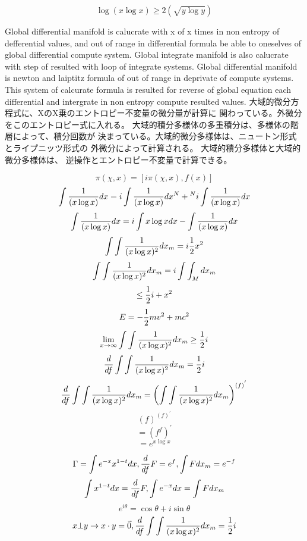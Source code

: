 \documentclass{jsarticle}
\begin{document}
  $$ \log (x \log x) \ge 2(\sqrt{y \log y}) $$

  Global differential manifold is calucrate with x of x times in non
  entropy of defferential values, and out of range in differential formula
  be able to oneselves of global differential compute system.
  Global integrate manifold is also calucrate with step of resulted with
  loop of integrate systems. Global differential manifold is newton and 
  laiptitz formula of out of range in deprivate of compute systems.
  This system of calcurate formula is resulted for reverse of global equation
  each differential and intergrate in non entropy compute resulted values.
  大域的微分方程式に、XのX乗のエントロピー不変量の微分量が計算に
  関わっている。外微分をこのエントロピー式に入れる。
  大域的積分多様体の多重積分は、多様体の階層によって、積分回数が
  決まっている。大域的微分多様体は、ニュートン形式とライプニッツ形式の
  外微分によって計算される。 大域的積分多様体と大域的微分多様体は、
  逆操作とエントロピー不変量で計算できる。


  $$ \pi(\chi,x) = [i\pi(\chi,x),f(x)] $$
  $$ \int{1 \over (x \log x)}dx = i \int{1 \over (x \log x)}dx^{N}  
  + {}^{N} i \int{1 \over (x \log x)}dx $$
  $$  \int{1 \over (x \log x)}dx = i \int{x \log x}dx 
  - \int{1 \over (x \log x)}dx $$
  $$ \int \int{1 \over (x \log x)^2}dx_m = i {1 \over 2}x^2 $$
  $$ \int \int{1 \over (x \log x)^2}dx_m = i \int \int_M dx_m $$
  $$ \le {1 \over 2}i + x^2 $$
  $$ E = - {1 \over 2}mv^2 + mc^2 $$
  $$ \lim_{x \to \infty} \int \int{1 \over (x \log x)^2}dx_m \ge {1 \over 2}i $$
  $$ {d \over df}\int \int{1 \over (x \log x)^2}dx_m = {1 \over 2}i $$
  $$ {d \over df}\int \int{1 \over (x \log x)^2}dx_m = 
  \left(\int \int {1 \over (x \log x)^2}dx_m \right)^{(f)^{'}}$$
  $$ (f)^{(f)^{'}} $$
  $$ = (f^f)^{'} $$
  $$ = e^{x \log x} $$

  $$ \Gamma = \int {e^{-x}x^{1-t}}dx, 
  {d \over df}F = e^f, \int F dx_m = e^{-f} $$
  $$ \int x^{1-t}dx = {d \over df}F, \int e^{-x}dx = \int F dx_m $$
  $$ e^{i \theta} = \cos \theta + i \sin \theta $$
  $$ x \bot y \to x \cdot y = \vec{0}, 
  {d \over df}\int \int{1 \over (x \log x)^2}dx_m = {1 \over 2}i $$
\end{document}
